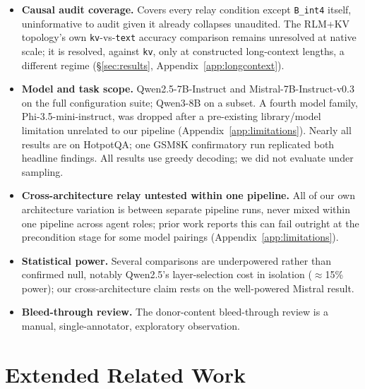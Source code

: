 \documentclass[11pt]{article}
\begin{document}
\begin{itemize}[leftmargin=*]
\item \textbf{Causal audit coverage.} Covers every relay condition
except \texttt{B\_int4} itself, uninformative to audit given it already
collapses unaudited. The RLM+KV topology's own \texttt{kv}-vs-\texttt{text}
accuracy comparison remains unresolved at native scale; it is resolved,
against \texttt{kv}, only at constructed long-context lengths, a
different regime (\S\ref{sec:results}, Appendix~\ref{app:longcontext}).
\item \textbf{Model and task scope.} Qwen2.5-7B-Instruct and
Mistral-7B-Instruct-v0.3 on the full configuration suite; Qwen3-8B on a
subset. A fourth model family, Phi-3.5-mini-instruct, was dropped after
a pre-existing library/model limitation unrelated to our pipeline
(Appendix~\ref{app:limitations}). Nearly all results are on HotpotQA; one
GSM8K confirmatory run replicated both headline findings. All results
use greedy decoding; we did not evaluate under sampling.
\item \textbf{Cross-architecture relay untested within one pipeline.}
All of our own architecture variation is between separate pipeline
runs, never mixed within one pipeline across agent roles; prior work
reports this can fail outright at the precondition stage for some model
pairings (Appendix~\ref{app:limitations}).
\item \textbf{Statistical power.} Several comparisons are underpowered
rather than confirmed null, notably Qwen2.5's layer-selection cost in
isolation ($\approx$15\% power); our cross-architecture claim rests on
the well-powered Mistral result.
\item \textbf{Bleed-through review.} The donor-content bleed-through
review is a manual, single-annotator, exploratory observation.
\end{itemize}




\appendix

\section{Extended Related Work}
\label{app:relwork}
\end{document}
